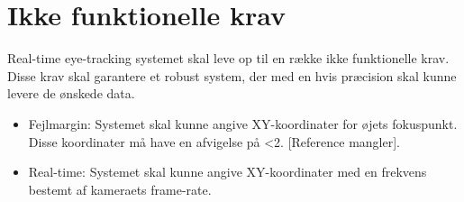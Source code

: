 \documentclass[kravspec.tex]{subfiles}
\begin{document}
	
\section{Ikke funktionelle krav}
Real-time eye-tracking systemet skal leve op til en række ikke funktionelle krav. Disse krav skal garantere et robust system, der med en hvis præcision skal kunne levere de ønskede data.\\
\begin{itemize}
	\item 
	Fejlmargin: Systemet skal kunne angive XY-koordinater for øjets fokuspunkt. Disse koordinater må have en afvigelse på <2\degree. [Reference mangler].
	\item 
	Real-time: Systemet skal kunne angive XY-koordinater med en frekvens bestemt af kameraets frame-rate. 
\end{itemize}
\end{document}
